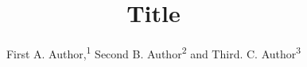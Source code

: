 \documentclass[10pt]{article}
\title{Title}
\author{First A. Author,\textsuperscript{1} Second B. Author\textsuperscript{2} and Third. C. Author\textsuperscript{3}}
\begin{document}
\maketitle


\begin{abstract}

\end{abstract}







\end{document}
